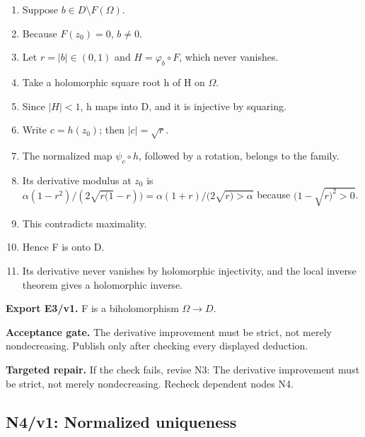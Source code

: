 \documentclass[preprint,12pt,aps,pra,showkeys,amsmath,amssymb,superscriptaddress,floatfix]{revtex4-2}
\theoremstyle{definition}
\theoremstyle{remark}
\newcommand{\field}[2]{\par\smallskip\noindent\textbf{#1.} #2\par}
\begin{document}
\begin{enumerate}[label=N3.\arabic*,leftmargin=3.4em]

\item Suppose \(b\in D\setminus F(\Omega )\).

\item Because \(F(z_{0})=0\), \(b\ne 0\).

\item Let \(r=|b|\in (0,1)\) and \(H=\varphi _b\circ F\), which never
vanishes.

\item Take a holomorphic square root h of H on \(\Omega\).

\item Since \(|H|<1\), h maps into D, and it is injective by squaring.

\item Write \(c=h(z_{0})\); then \(|c|=\sqrt{r}\).

\item The normalized map \(\psi _c\circ h\), followed by a rotation, belongs
to the family.

\item Its derivative modulus at \(z_{0}\) is
\(\alpha (1-r^{2})/(2\sqrt{r(1}-r))=\alpha (1+r)/(2\sqrt{r)>\alpha }\)
because \((1-\sqrt{r)^{2}>0}\).

\item This contradicts maximality.

\item Hence F is onto D.

\item Its derivative never vanishes by holomorphic injectivity, and the local
inverse theorem gives a holomorphic inverse.

\end{enumerate}

\field{Export E3/v1}{F is a biholomorphism \(\Omega \to D\).}

\field{Acceptance gate}{The derivative improvement must be strict, not merely nondecreasing.
Publish only after checking every displayed deduction.}

\field{Targeted repair}{If the check fails, revise N3: The derivative improvement must be
strict, not merely nondecreasing. Recheck dependent nodes N4.}

\clearpage

\subsection{N4/v1: Normalized uniqueness}
\end{document}
